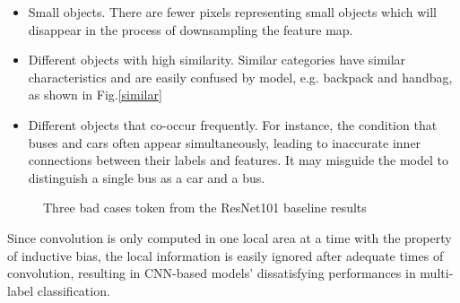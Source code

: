 \documentclass{article} \usepackage[numbers,sort&compress]{natbib}
\begin{document}
\begin{itemize}
\item Small objects. There are fewer pixels representing small objects which will disappear in the process of downsampling the feature map.
\item Different objects with high similarity. Similar categories have similar characteristics and are easily confused by model, e.g. backpack and handbag, as shown in Fig.\ref{similar}
\item Different objects that co-occur frequently. For instance, the condition that buses and cars often appear simultaneously, leading to inaccurate inner connections between their labels and features. It may misguide the model to distinguish a single bus as a car and a bus.
\end{itemize}

\begin{figure}[h]
\begin{center}
\end{center}
\caption{Three bad cases token from the ResNet101 baseline results}
\label{figure1}
\end{figure}
Since convolution is only computed in one local area at a time with the property of inductive bias, the local information is easily ignored after adequate times of convolution, resulting in CNN-based models' dissatisfying performances in multi-label classification. 
\end{document}
